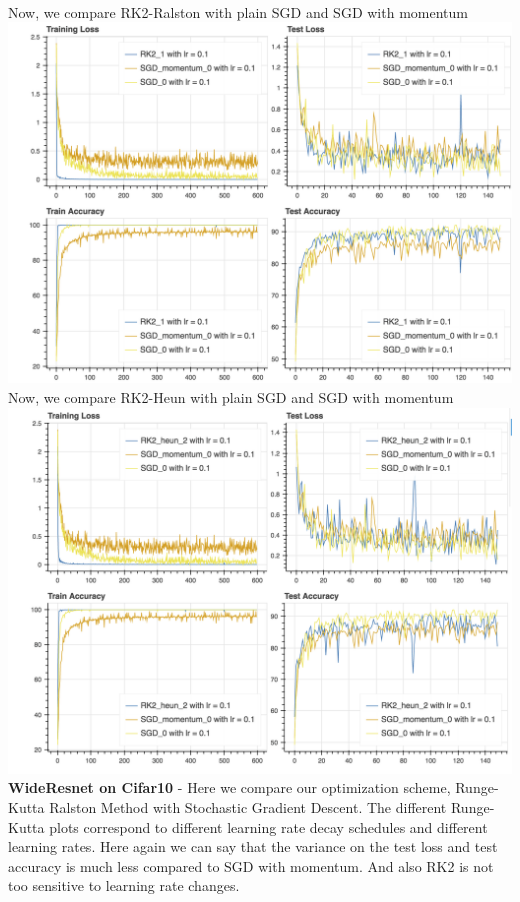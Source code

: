 \\
Now, we compare RK2-Ralston with plain SGD and SGD with momentum
\\
\includegraphics[scale=0.4]{plots/resnet_1.png}
\\
Now, we compare RK2-Heun with plain SGD and SGD with momentum
\\
\includegraphics[scale=0.4]{plots/resnet_2.png}
\\
\textbf{WideResnet on Cifar10} -
Here we compare our optimization scheme, Runge-Kutta Ralston Method with Stochastic Gradient Descent. The different Runge-Kutta plots correspond to different learning rate decay schedules and different learning rates. Here again we can say that the variance on the test loss and test accuracy is much less compared to SGD with momentum. And also RK2 is not too sensitive to learning rate changes.

